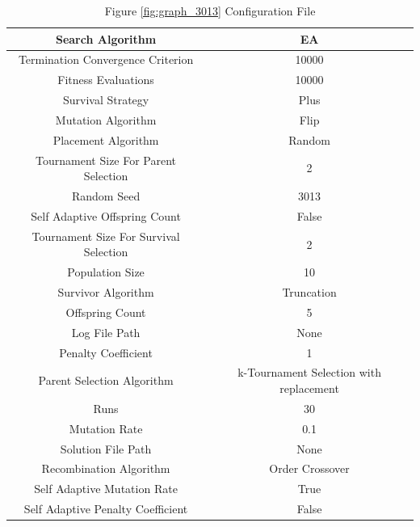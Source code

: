\documentclass{standalone}
\begin{document}
\begin{table}[!htb]
	\centering
	\caption{Figure \ref{fig:graph_3013} Configuration File}
	\label{tab:graph_3013}
	\begin{tabular}{| c | c |}
		\hline
		Search Algorithm		& EA		 \\
		\hline
		Termination Convergence Criterion		& 10000		 \\
		\hline
		Fitness Evaluations		& 10000		 \\
		\hline
		Survival Strategy		& Plus		 \\
		\hline
		Mutation Algorithm		& Flip		 \\
		\hline
		Placement Algorithm		& Random		 \\
		\hline
		Tournament Size For Parent Selection		& 2		 \\
		\hline
		Random Seed		& 3013		 \\
		\hline
		Self Adaptive Offspring Count		& False		 \\
		\hline
		Tournament Size For Survival Selection		& 2		 \\
		\hline
		Population Size		& 10		 \\
		\hline
		Survivor Algorithm		& Truncation		 \\
		\hline
		Offspring Count		& 5		 \\
		\hline
		Log File Path		& None		 \\
		\hline
		Penalty Coefficient		& 1		 \\
		\hline
		Parent Selection Algorithm		& k-Tournament Selection with replacement		 \\
		\hline
		Runs		& 30		 \\
		\hline
		Mutation Rate		& 0.1		 \\
		\hline
		Solution File Path		& None		 \\
		\hline
		Recombination Algorithm		& Order Crossover		 \\
		\hline
		Self Adaptive Mutation Rate		& True		 \\
		\hline
		Self Adaptive Penalty Coefficient		& False		 \\
		\hline
	\end{tabular}
\end{table}
\end{document}

